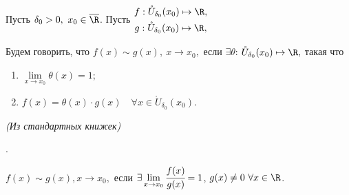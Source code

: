 \begin{definition}
    Пусть $\delta_{0} > 0, \ x_{0} \in \overline{\R}$. Пусть $ \begin{gathered}
        f: \mathring{U}_{\delta_{0}}(x_{0}) \mapsto \R, \\
        g:\mathring{U}_{\delta_{0}}(x_{0}) \mapsto \R,
    \end{gathered}$ 
    
    Будем говорить, что $f(x) \sim g(x),\  x\to x_{0},$ если $\exists \theta$:  $\mathring{U}_{\delta_{0}}(x_{0}) \mapsto \R,$ такая что \begin{enumerate}
        \item $\lim\limits_{x \to x_{0}} \theta(x)= 1$;
        \item $f(x) = \theta(x) \cdot g(x) \quad \forall x \in \mathring{U}_{\delta_{0}}(x_{0}).$
    \end{enumerate}
\end{definition}

\begin{definition}
    \hypertarget{def4.40}{\textit{(Из стандартных книжек)}}.

    $f(x) \sim g(x), x\to x_{0},$ если $\exists
     \lim\limits_{x \to x_{0}} \cfrac{f(x)}{g(x)} = 1$, $g (x) \neq 0 \ \forall x \in \R$.
\end{definition}

